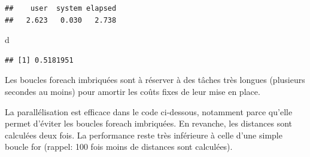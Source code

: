 \documentclass[
  12pt,
  french,
  a4paper,
  extrafontsizes,onecolumn,openright
  ]{memoir}
\newenvironment{Shaded}{\begin{snugshade}}{\end{snugshade}}
\newcommand{\ControlFlowTok}[1]{\textcolor[rgb]{0.13,0.29,0.53}{\textbf{#1}}}
\newcommand{\DataTypeTok}[1]{\textcolor[rgb]{0.13,0.29,0.53}{#1}}
\newcommand{\DecValTok}[1]{\textcolor[rgb]{0.00,0.00,0.81}{#1}}
\newcommand{\KeywordTok}[1]{\textcolor[rgb]{0.13,0.29,0.53}{\textbf{#1}}}
\newcommand{\NormalTok}[1]{#1}
\newcommand{\OperatorTok}[1]{\textcolor[rgb]{0.81,0.36,0.00}{\textbf{#1}}}
\newcommand{\StringTok}[1]{\textcolor[rgb]{0.31,0.60,0.02}{#1}}
\newlength{\rf}
\begin{document}
\begin{verbatim}
##    user  system elapsed 
##   2.623   0.030   2.738
\end{verbatim}

\begin{Shaded}
\begin{Highlighting}[]
\NormalTok{d}
\end{Highlighting}
\end{Shaded}

\begin{verbatim}
## [1] 0.5181951
\end{verbatim}

\normalsize

Les boucles foreach imbriquées sont à réserver à des tâches très longues (plusieurs secondes au moins) pour amortir les coûts fixes de leur mise en place.

La parallélisation est efficace dans le code ci-dessous, notamment parce qu'elle permet d'éviter les boucles foreach imbriquées.
En revanche, les distances sont calculées deux fois.
La performance reste très inférieure à celle d'une simple boucle for (rappel: 100 fois moins de distances sont calculées).

\scriptsize

\begin{Shaded}
\end{Shaded}
\end{document}
